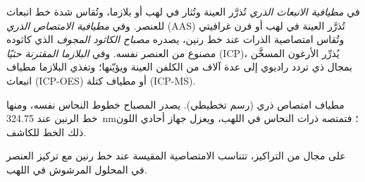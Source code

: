 \begin{definition}\label{def:b2:mass-spec-atomic:atomic}
في \emph{مطيافية الانبعاث الذري} تُذرَّر العينة 
وتُثار في لهب أو بلازما، وتُقاس شدة خط انبعاث للعنصر. وفي
\emph{مطيافية الامتصاص الذري} (AAS) تُذرَّر العينة
في لهب أو فرن غرافيتي وتُقاس امتصاصية الذرات عند خط
رنين، يصدره \emph{مصباح الكاثود المجوف} الذي كاثوده مصنوع من
العنصر نفسه. وفي \emph{البلازما المقترنة حثيًا} (ICP)، يُذرِّر الأرغون
المسخَّن بمجال ذي تردد راديوي إلى عدة آلاف من الكلفن العينة ويؤيّنها؛ 
وتغذي البلازما مطياف انبعاث (ICP-OES) أو مطياف كتلة (ICP-MS).
\end{definition}

\begin{omfigure}
\par\vspace{4pt}

{\small مطياف امتصاص ذري (رسم تخطيطي). يصدر المصباح خطوط النحاس نفسه، ومنها
خط الرنين عند \qty{324.75}{nm}؛ فتمتصه ذرات النحاس في اللهب، 
ويعزل جهاز أحادي اللون ذلك الخط للكاشف.}
\end{omfigure}

\begin{proposition}\label{prop:b2:mass-spec-atomic:aas}
على مجال من التراكيز، تتناسب الامتصاصية المقيسة عند خط رنين مع
تركيز العنصر في المحلول المرشوش في اللهب.
\end{proposition}

